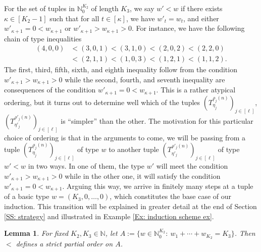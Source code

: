 \documentclass[11pt]{amsart}
\newtheorem{lemma}{Lemma}[section]
\theoremstyle{definition}
\newcommand{\N}{{\mathbb N}}
\newcommand{\brac}[1]{\mathopen{}\left( #1 \mathclose{}\right)}
\begin{document}
For the set of tuples in $\N_0^{K_2}$ of length $K_3$, we say $w'<w$ if there exists $\kappa\in[K_2-1]$ such that for all $t\in[\kappa]$, we have $w'_t = w_t$, and either $w'_{\kappa+1} = 0 < w_{\kappa+1}$ or $w'_{\kappa+1}>w_{\kappa+1}>0$. For instance, we have the following chain of type inequalities
\begin{align*}
    (4, 0, 0) &< (3, 0, 1) < (3, 1, 0) < (2, 0, 2) < (2, 2, 0)\\
    &< (2, 1, 1) < (1, 0, 3) < (1, 2, 1) < (1, 1, 2).
\end{align*}
The first, third, fifth, sixth, and eighth inequality follow from the condition $w'_{\kappa+1}>w_{\kappa+1}>0$ while the second, fourth, and seventh inequality are consequences of the condition $w'_{\kappa+1} = 0 < w_{\kappa+1}$.
This is a rather atypical ordering, but it turns out to determine well which of the tuples  $\brac{T_{\eta_j}^{\rho_j(n)}}_{j\in[\ell]}$, $\brac{T_{\eta'_j}^{\rho'_j(n)}}_{j\in[\ell]}$ is ``simpler'' than the other. The motivation for this particular choice of ordering is that in the arguments to come, we will be passing from a tuple $\brac{T_{\eta_j}^{\rho_j(n)}}_{j\in[\ell]}$ of type $w$ to another tuple $\brac{T_{\eta'_j}^{\rho'_j(n)}}_{j\in[\ell]}$ of type $w'<w$ in two ways. In one of them, the type $w'$ will meet the condition $w'_{\kappa+1}>w_{\kappa+1}>0$ while in the other one, it will satisfy the condition $w'_{\kappa+1} = 0 < w_{\kappa+1}$. Arguing this way, we arrive in finitely many steps at a tuple of a basic type $w=(K_3, 0, \ldots, 0)$, which constitutes the base case of our induction.  This transition will be explained in greater detail at the end of Section \ref{SS: strategy} and illustrated in Example \ref{Ex: induction scheme ex}.
\begin{lemma}\label{L: type order}
For fixed $K_2,K_3\in\N$, let  $A:=\{w\in\N_0^{K_2}:\ w_1+\cdots+w_{K_2} = K_3\}$. Then $<$ defines a strict partial order on $A$.
\end{lemma}
\end{document}
